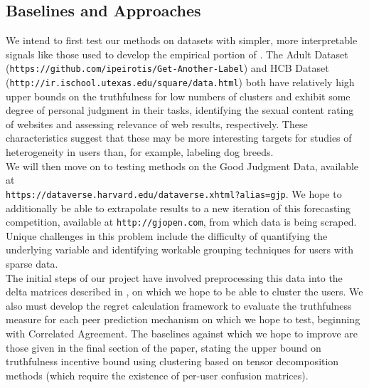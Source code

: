 \documentclass[a4paper, 12pt]{article}
\begin{document}
\subsection{Baselines and Approaches}
We intend to first test our methods on datasets with simpler, more interpretable signals like those used to develop the empirical portion of \citet{agarwal2017peer}. The Adult Dataset (\texttt{https://github.com/ipeirotis/Get-Another-Label}) and HCB Dataset \\ (\texttt{http://ir.ischool.utexas.edu/square/data.html}) both have relatively high upper bounds on the truthfulness for low numbers of clusters and exhibit some degree of personal judgment in their tasks, identifying the sexual content rating of websites and assessing relevance of web results, respectively. These characteristics suggest that these may be more interesting targets for studies of heterogeneity in users than, for example, labeling dog breeds. \\

We will then move on to testing methods on the Good Judgment Data, available at \\
\texttt{https://dataverse.harvard.edu/dataverse.xhtml?alias=gjp}. We hope to additionally be able to extrapolate results to a new iteration of this forecasting competition, available at \texttt{http://gjopen.com}, from which data is being scraped. Unique challenges in this problem include the difficulty of quantifying the underlying variable and identifying workable grouping techniques for users with sparse data. \\

The initial steps of our project have involved preprocessing this data into the delta matrices described in \citet{agarwal2017peer}, on which we hope to be able to cluster the users. We also must develop the regret calculation framework to evaluate the truthfulness measure for each peer prediction mechanism on which we hope to test, beginning with Correlated Agreement. The baselines against which we hope to improve are those given in the final section of the paper, stating the upper bound on truthfulness incentive bound using clustering based on tensor decomposition methods (which require the existence of per-user confusion matrices). \\
\end{document}
